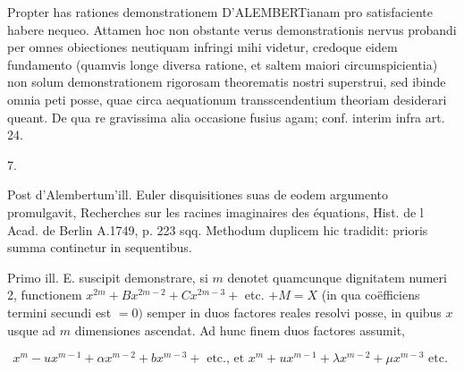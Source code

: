 \documentclass[twoside,12pt, showframe]{memoir}
\begin{document}
Propter has rationes demonstrationem D'ALEMBERTianam pro satisfaciente habere nequeo. Attamen hoc non obstante verus demonstrationis nervus probandi per omnes obiectiones neutiquam infringi mihi videtur, credoque eidem fundamento (quamvis longe diversa ratione, et saltem maiori circumspicientia) non solum demonstrationem rigorosam theorematis nostri superstrui, sed ibinde omnia peti posse, quae circa aequationum transscendentium theoriam desiderari queant. De qua re gravissima alia occasione fusius agam; conf. interim infra art. 24.

7.

Post d'Alembertum'ill. Euler disquisitiones suas de eodem argumento promulgavit, Recherches sur les racines imaginaires des équations, Hist. de l Acad. de Berlin A.1749, p. 223 sqq. Methodum duplicem hic tradidit: prioris summa continetur in sequentibus.

Primo ill. E. suscipit demonstrare, si \(m\) denotet quamcunque dignitatem numeri 2, functionem \(x^{2 m}+B x^{2 m-2}+C x^{2 m-3}+\) etc. \(+M=X\) (in qua coëfficiens termini secundi est \(=0)\) semper in duos factores reales resolvi posse, in quibus \(x\) usque ad \(m\) dimensiones ascendat. Ad hunc finem duos factores assumit,

\[
x^{m}-u x^{m-1}+\alpha x^{m-2}+b x^{m-3}+\text { etc., et } x^{m}+u x^{m-1}+\lambda x^{m-2}+\mu x^{m-3} \text { etc. }
\]
\end{document}
